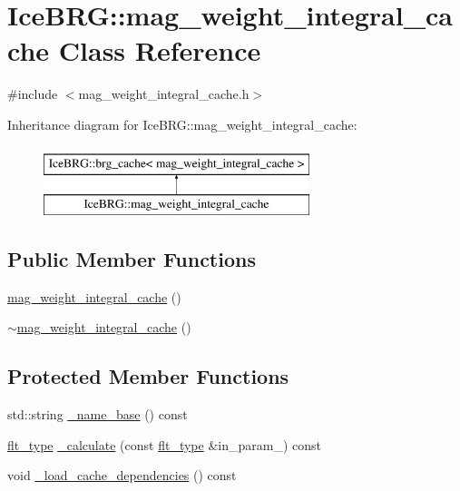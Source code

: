 \hypertarget{classIceBRG_1_1mag__weight__integral__cache}{\section{Ice\-B\-R\-G\-:\-:mag\-\_\-weight\-\_\-integral\-\_\-cache Class Reference}
\label{classIceBRG_1_1mag__weight__integral__cache}
}


{\ttfamily \#include $<$mag\-\_\-weight\-\_\-integral\-\_\-cache.\-h$>$}

Inheritance diagram for Ice\-B\-R\-G\-:\-:mag\-\_\-weight\-\_\-integral\-\_\-cache\-:\begin{figure}[H]
\begin{center}
\leavevmode
\includegraphics[height=2.000000cm]{classIceBRG_1_1mag__weight__integral__cache}
\end{center}
\end{figure}
\subsection*{Public Member Functions}
\begin{DoxyCompactItemize}
\item 
\hyperlink{classIceBRG_1_1mag__weight__integral__cache_ab891c0d594154de0145e41bc2c1b98f4}{mag\-\_\-weight\-\_\-integral\-\_\-cache} ()
\item 
\hyperlink{classIceBRG_1_1mag__weight__integral__cache_a743fcaa1cdbde9d28d19e0d916e49c8d}{$\sim$mag\-\_\-weight\-\_\-integral\-\_\-cache} ()
\end{DoxyCompactItemize}
\subsection*{Protected Member Functions}
\begin{DoxyCompactItemize}
\item 
std\-::string \hyperlink{classIceBRG_1_1mag__weight__integral__cache_aeab1aa78cf663d1e255fffb2746f1e79}{\-\_\-name\-\_\-base} () const 
\item 
\hyperlink{lib_2IceBRG__main_2common_8h_ad0f130a56eeb944d9ef2692ee881ecc4}{flt\-\_\-type} \hyperlink{classIceBRG_1_1mag__weight__integral__cache_a27435d81e53ee8cba625e76986e4da7b}{\-\_\-calculate} (const \hyperlink{lib_2IceBRG__main_2common_8h_ad0f130a56eeb944d9ef2692ee881ecc4}{flt\-\_\-type} \&in\-\_\-param\-\_) const 
\item 
void \hyperlink{classIceBRG_1_1mag__weight__integral__cache_a77b23616c7c1942f45998e4b016ef1f7}{\-\_\-load\-\_\-cache\-\_\-dependencies} () const 
\end{DoxyCompactItemize}
